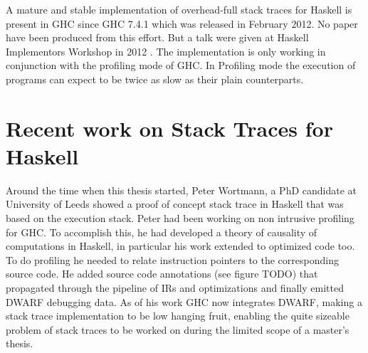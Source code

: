 A mature and stable implementation of overhead-full stack traces for
Haskell is present in GHC since GHC 7.4.1 which was released in February
2012. No paper have been produced from this effort. But a talk were
given at Haskell Implementors Workshop in 2012 \cite{HIW2012Programme}.
The implementation is only working in conjunction with the profiling
mode of GHC. In Profiling mode the execution of programs can expect to
be twice as slow as their plain counterparts.

\section{Recent work on Stack Traces for Haskell} \label{sec:recent_work}

Around the time when this thesis started, Peter Wortmann, a
PhD candidate at University of Leeds showed a proof of concept
stack trace in Haskell that was based on the execution stack.
\cite{stack_traces_ticket} Peter had been working on non intrusive
profiling for GHC. To accomplish this, he had developed a theory of
causality of computations in Haskell, in particular his work extended to
optimized code too. \cite{DBLP:conf/haskell/WortmannD13} To do profiling
he needed to relate instruction pointers to the corresponding source
code. He added source code annotations (see figure TODO) that propagated
through the pipeline of IRs and optimizations and finally emitted DWARF
debugging data. As of his work GHC now integrates DWARF, making a
stack trace implementation to be low hanging fruit, enabling the quite
sizeable problem of stack traces to be worked on during the limited
scope of a master's thesis.
